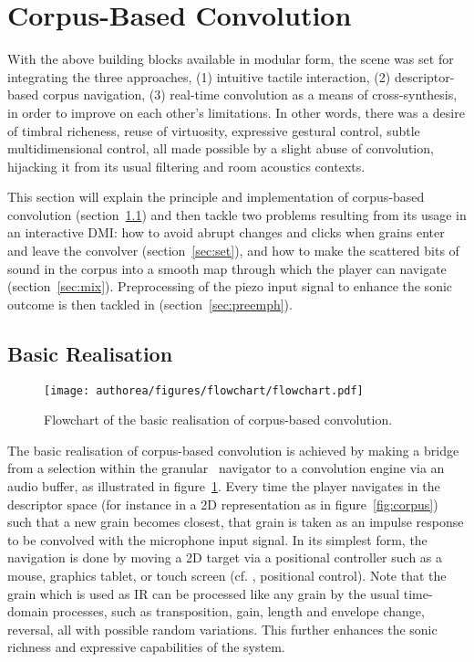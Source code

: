 \section{Corpus-Based Convolution} %

With the above building blocks available in modular form, the scene was set for integrating the three approaches, (1) intuitive tactile interaction, (2) descriptor-based corpus navigation, (3) real-time convolution as a means of cross-\hspace{0pt}synthesis, in order to improve on each other's limitations. In other words, there was a desire of timbral richeness, reuse of virtuosity, expressive gestural control, subtle multidimensional control, all made possible by a slight abuse of convolution, hijacking it from its usual filtering and room acoustics contexts.

This section will explain the principle and implementation of corpus-based convolution (section~\ref{sec:basic}) and then tackle two problems resulting from its usage in an interactive DMI: 
how to avoid abrupt changes and clicks when grains enter and leave the convolver (section~\ref{sec:set}), and
how to make the scattered bits of sound in the corpus into a smooth map through which the player can navigate (section~\ref{sec:mix}). Preprocessing of the piezo input signal to enhance the sonic outcome is then tackled in (section~\ref{sec:preemph}).

\subsection{Basic Realisation}\label{sec:basic}

\begin{figure}[htb] 
\texttt{[image: authorea/figures/flowchart/flowchart.pdf]} 
\caption{Flowchart of the basic realisation of corpus-based convolution.}
\label{fig:schema} 
\end{figure} 


\noindent The basic realisation of corpus-based convolution is achieved by making a bridge from a selection within the granular \cbcs\ navigator to a convolution engine via an audio buffer, as illustrated in figure~\ref{fig:schema}.  Every time the player navigates in the descriptor space (for instance in a 2D representation as in figure~\ref{fig:corpus}) such that a new grain becomes closest, that grain is taken as an impulse response to be convolved with the microphone input signal.  In its simplest form, the navigation is done by moving a 2D target via a positional controller such as a mouse, graphics tablet, or touch screen (cf. \cite{Schwarz-nime2012-sound-space}, positional control).
%
Note that the grain which is used as IR can be processed like any grain by the usual time-domain processes, such as transposition, gain, length and envelope change, reversal, all with possible random variations. This further enhances the sonic richness and expressive capabilities of the system.

